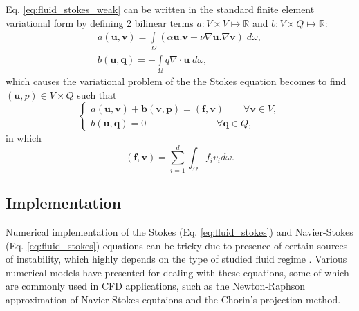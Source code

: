 Eq. \ref{eq:fluid_stokes_weak} can be written in the standard finite element variational form by defining 2 bilinear terms $a: V \times V \mapsto \mathbb{R}$ and $b: V \times Q \mapsto \mathbb{R}$:
\begin{equation}
\begin{array}{*{20}{l}}
\displaystyle  {a({\mathbf{u}},{\mathbf{v}}) = \int\limits_\Omega  {(\alpha {\mathbf{u}}.{\mathbf{v}} + \nu\nabla {\mathbf{u}}.\nabla {\mathbf{v}})\;d\omega ,} } \\
\displaystyle  {b({\mathbf{u}},{\mathbf{q}}) =  - \int\limits_\Omega  {q\nabla\cdot{\mathbf{u}}\;d\omega ,} }
\end{array}
\end{equation}
which causes the variational problem of the the Stokes equation becomes to find $(\mathbf{u}, p) \in V \times Q$ such that
\begin{equation}
\left\{ {\begin{array}{*{20}{l}}
\displaystyle  {a({\mathbf{u}},{\mathbf{v}}) + {\mathbf{b}}({\mathbf{v}},{\mathbf{p}}) = ({\mathbf{f}},{\mathbf{v}})\qquad {\forall {\mathbf{v}}} \in V,} \\
\displaystyle  {b({\mathbf{u}},{\mathbf{q}}) = 0\qquad \qquad \qquad \quad \;{\forall {\mathbf{q}}} \in Q,}
\end{array}} \right.
\end{equation}
in which
\begin{equation}
(\mathbf{f}, \mathbf{v})=\sum_{i=1}^{d} \int_{\Omega} f_{i} v_{i} d \omega.
\end{equation}


\subsection{Implementation}

Numerical implementation of the Stokes (Eq. \ref{eq:fluid_stokes}) and Navier-Stokes (Eq. \ref{eq:fluid_stokes}) equations can be tricky due to presence of certain sources of instability, which highly depends on the type of studied fluid regime \cite{Girault1979, Elman2014}. Various numerical models have presented for dealing with these equations, some of which are commonly used in CFD applications, such as the Newton-Raphson approximation of Navier-Stokes equtaions and the Chorin's projection method.

